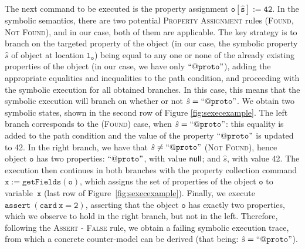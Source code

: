 The next command to be executed is the property assignment $\mathtt{o[\hat{s}] := 42}$. In the symbolic semantics, there are two potential \textsc{Property Assignment} rules (\textsc{Found}, \textsc{Not Found}), and in our case, both of them are applicable. The key strategy is to branch on the targeted property of the object (in our case, the symbolic property $\hat{s}$ of object at location $\mathtt{l_o}$) being equal to any one or none of the already existing properties of the object (in our case, we have only $\mathtt{``@proto"}$), adding the appropriate equalities and inequalities to the path condition, and proceeding with the symbolic execution for all obtained branches. In this case, this means that the symbolic execution will branch on whether or not $\hat{s} = \mathtt{``@proto"}$. We obtain two symbolic states, shown in the second row of Figure \ref{fig:sexecexample}. The left branch corresponds to the (\textsc{Found}) case, when $\hat{s} = \mathtt{``@proto"}$: this equality is added to the path condition and the value of the property $\mathtt{``@proto"}$ is updated to 42. In the right branch, we have that $\hat{s} \neq \mathtt{``@proto"}$ (\textsc{Not Found}), hence object $\mathtt{o}$ has two properties: $ \mathtt{``@proto"}$, with value ${\sf null}$; and $\hat{s}$, with value 42. 
The execution then continues in both branches with the property collection command $\mathtt{x := getFields(o)}$, which assigns the set of properties of the object $\mathtt{o}$ to variable~$\mathtt{x}$ (last row of Figure~\ref{fig:sexecexample}). Finally, we execute $\mathtt{assert\ (card \ x = 2)}$, asserting that the object $\mathtt{o}$ has exactly two properties, which we observe to hold in the right branch, but not in the left. Therefore, following the \textsc{Assert - False} rule, we obtain a failing symbolic execution trace, from which a concrete counter-model can be derived (that being: $\hat{s} = \mathtt{``@proto"}$).



